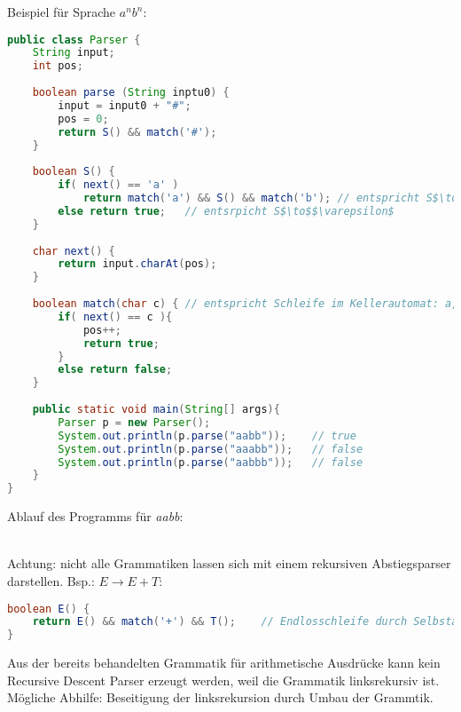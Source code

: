 Beispiel für Sprache $a^nb^n$:
\begin{lstlisting}[language=java]
public class Parser {
	String input;
	int pos;
	
	boolean parse (String inptu0) {
		input = input0 + "#";
		pos = 0;
		return S() && match('#');
	}
	
	boolean S() {	
		if( next() == 'a' )
			return match('a') && S() && match('b');	// entspricht S$\to$aSb
		else return true;	// entsrpicht S$\to$$\varepsilon$
	}
	
	char next() {
		return input.charAt(pos);
	}
	
	boolean match(char c) {	// entspricht Schleife im Kellerautomat: a,a/$\varepsilon$ und b,b/$\varepsilon$ bzw. S,$\varepsilon$/aSb
		if( next() == c ){
			pos++;
			return true;
		}
		else return false;
	}
	
	public static void main(String[] args){
		Parser p = new Parser();
		System.out.println(p.parse("aabb"));	// true
		System.out.println(p.parse("aaabb"));	// false
		System.out.println(p.parse("aabbb"));	// false
	}
}
\end{lstlisting}
Ablauf des Programms für \emph{aabb}:\\
\\
Achtung: nicht alle Grammatiken lassen sich mit einem rekursiven Abstiegsparser darstellen. Bsp.: $E\to E+T$:
\begin{lstlisting}[language=java]
boolean E() {
	return E() && match('+') && T();	// Endlosschleife durch Selbstaufruf
}	
\end{lstlisting}
Aus der bereits behandelten Grammatik für arithmetische Ausdrücke kann kein Recursive Descent Parser erzeugt werden, weil die Grammatik linksrekursiv ist. Mögliche Abhilfe: Beseitigung der linksrekursion durch Umbau der Grammtik.\\
